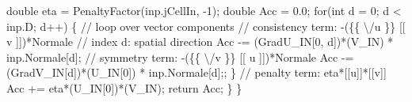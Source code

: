 {\btab \btab double eta = PenaltyFactor(inp.jCellIn, -1);\newline 
\btab \btab double Acc = 0.0;\newline 
\btab \btab for(int d = 0; d < inp.D; d++) \{ // loop over vector components \newline 
\btab \btab \btab // consistency term: -(\{\{ \textbackslash /u \}\} [[ v ]])*Normale\newline 
\btab \btab \btab // index d: spatial direction\newline 
\btab \btab \btab Acc -= (GradU\_IN[0, d])*(V\_IN) * inp.Normale[d];\newline 
 \newline 
\btab \btab \btab // symmetry term: -(\{\{ \textbackslash /v \}\} [[ u ]])*Normale\newline 
\btab \btab \btab Acc -= (GradV\_IN[d])*(U\_IN[0]) * inp.Normale[d];;\newline 
\btab \btab \}\newline 
 \newline 
\btab \btab // penalty term: eta*[[u]]*[[v]]\newline 
\btab \btab Acc += eta*(U\_IN[0])*(V\_IN);\newline 
 \newline 
 \newline 
\btab \btab return Acc;\newline 
\btab \}\newline 
\}
 }
\BoSSSexe
